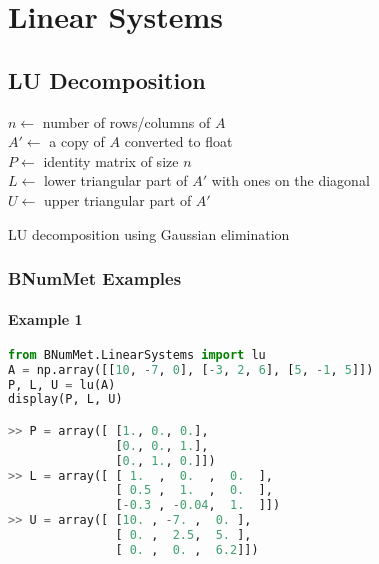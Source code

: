 \section{Linear Systems}
\subsection{LU Decomposition}

\begin{algorithm}[H]
    \SetAlgoLined
    $n \gets$ number of rows/columns of $A$ \\
    $A' \gets$ a copy of $A$ converted to float \\
    $P \gets$ identity matrix of size $n$ \\
    $L \gets$ lower triangular part of $A'$ with ones on the diagonal \\
    $U \gets$ upper triangular part of $A'$ \\
    \caption{LU decomposition using Gaussian elimination}
\end{algorithm}
\subsubsection{BNumMet Examples}
\paragraph{Example 1}{
\begin{lstlisting}[language=Python]
from BNumMet.LinearSystems import lu
A = np.array([[10, -7, 0], [-3, 2, 6], [5, -1, 5]])
P, L, U = lu(A)
display(P, L, U)

>> P = array([ [1., 0., 0.],
               [0., 0., 1.],
               [0., 1., 0.]])
>> L = array([ [ 1.  ,  0.  ,  0.  ],
               [ 0.5 ,  1.  ,  0.  ],
               [-0.3 , -0.04,  1.  ]])
>> U = array([ [10. , -7. ,  0. ],
               [ 0. ,  2.5,  5. ],
               [ 0. ,  0. ,  6.2]])
           
\end{lstlisting}
}


